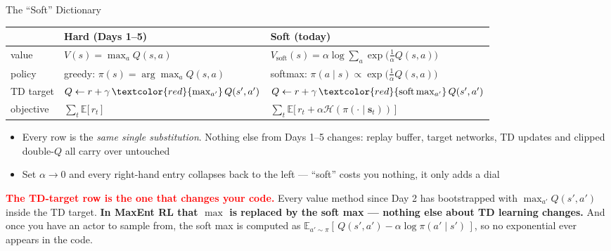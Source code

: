 \begin{frame}{The ``Soft'' Dictionary}
\small
\begin{center}
\renewcommand{\arraystretch}{1.7}
\begin{tabular}{p{} p{} p{}}
\hline
& \textbf{Hard (Days 1--5)} & \textbf{Soft (today)} \\
\hline
value & $V(s) = \max_a Q(s,a)$
      & $V_{\text{soft}}(s) = \alpha\log\sum_a \exp\!\big(\tfrac1\alpha Q(s,a)\big)$ \\
policy & greedy: $\pi(s) = \arg\max_a Q(s,a)$
      & softmax: $\pi(a\mid s) \propto \exp\!\big(\tfrac1\alpha Q(s,a)\big)$ \\
TD target & $Q \leftarrow r + \gamma \,\textcolor{red}{\max_{a'}}\, Q(s',a')$
      & $Q \leftarrow r + \gamma \,\textcolor{red}{\operatorname{soft\,max}_{a'}}\, Q(s',a')$ \\
objective & $\sum_t \mathbb{E}\big[\,r_t\,\big]$
      & $\sum_t \mathbb{E}\big[\,r_t + \alpha\mathcal{H}(\pi(\cdot\mid \mathbf{s}_t))\,\big]$ \\
\hline
\end{tabular}
\end{center}
\vspace{0.1em}
{\footnotesize
\begin{itemize}
    \item Every row is the \emph{same single substitution}. Nothing else from Days 1--5 changes: replay buffer, target networks, TD updates and clipped double-$Q$ all carry over untouched
    \item Set $\alpha \to 0$ and every right-hand entry collapses back to the left --- ``soft'' costs you nothing, it only adds a dial
\end{itemize}
\vspace{0.3em}
\textcolor{red}{\textbf{The TD-target row is the one that changes your code.}} Every value method since Day 2 has bootstrapped with $\max_{a'}Q(s',a')$ inside the TD target. \textbf{In MaxEnt RL that $\max$ is replaced by the soft max --- nothing else about TD learning changes.} And once you have an actor to sample from, the soft max is computed as $\mathbb{E}_{a'\sim\pi}[\,Q(s',a') - \alpha\log\pi(a'\mid s')\,]$, so no exponential ever appears in the code.}
\end{frame}
